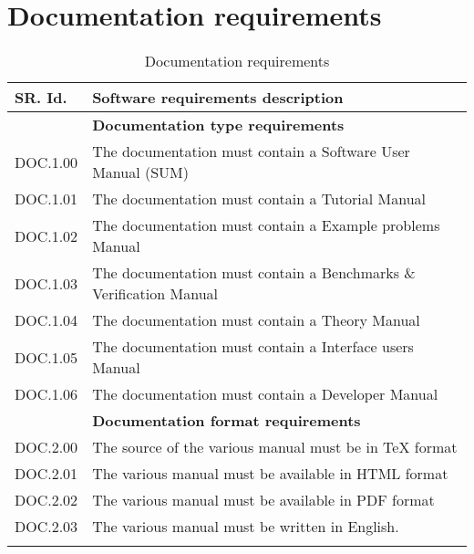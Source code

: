 \section{Documentation requirements}
\begin{longtable}{%
    |>{\columncolor[gray]{.8}}p{}%
    |>{\columncolor[gray]{.95}}p{}|}
  \hline
  \rowcolor[gray]{.8}   SR. Id. & Software requirements description \\
  \hline 
  & \textbf{ Documentation type requirements }\\
  \hline
  DOC.1.00 & The documentation must contain a Software User Manual (SUM)  \\
  DOC.1.01 & The documentation must contain a Tutorial Manual\\
  DOC.1.02 & The documentation must contain a Example problems Manual\\
  DOC.1.03 & The documentation must contain a Benchmarks \& Verification Manual\\
  DOC.1.04 & The documentation must contain a Theory Manual\\
  DOC.1.05 & The documentation must contain a Interface users Manual\\
  DOC.1.06 & The documentation must contain a Developer Manual\\
  \hline 
  & \textbf{ Documentation format requirements }\\
  \hline
  DOC.2.00 & The source of the various manual must be in TeX format\\
  DOC.2.01 & The various manual must be available in HTML format\\
  DOC.2.02 & The various manual must be available in PDF format\\
  DOC.2.03 & The various manual must be written in English.\\
 \hline
  \caption{Documentation requirements}\\
\end{longtable}



